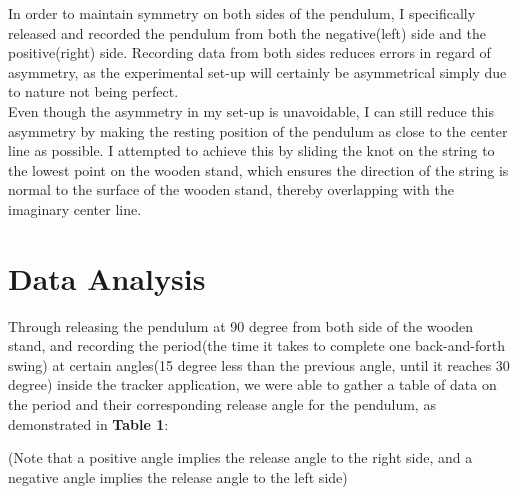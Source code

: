 \documentclass{article}
\begin{document}
In order to maintain symmetry on both sides of the pendulum, I specifically released and recorded the pendulum from both the negative(left) side and the positive(right) side. Recording data from both sides reduces errors in regard of asymmetry, as the experimental set-up will certainly be asymmetrical simply due to nature not being perfect.\\

\noindent Even though the asymmetry in my set-up is unavoidable, I can still reduce this asymmetry by making the resting position of the pendulum as close to the center line as possible. I attempted to achieve this by sliding the knot on the string to the lowest point on the wooden stand, which ensures the direction of the string is normal to the surface of the wooden stand, thereby overlapping with the imaginary center line.

\section{Data Analysis}

Through releasing the pendulum at 90 degree from both side of the wooden stand, and recording the period(the time it takes to complete one back-and-forth swing) at certain angles(15 degree less than the previous angle, until it reaches 30 degree) inside the tracker application, we were able to gather a table of data on the period and their corresponding release angle for the pendulum, as demonstrated in \textbf{Table 1}: \\

\begin{center}(Note that a positive angle implies the release angle to the right side, and a negative angle implies the release angle to the left side)
\end{center}
\end{document}
